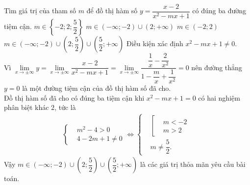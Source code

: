 \begin{ex}%
 Tìm giá trị của tham số $m$ để đồ thị hàm số $y=\dfrac{x-2}{x^2-mx+1}$ có đúng ba đường tiệm cận.
 \choice
  {$m\in\left\{-2;2;\dfrac{5}{2}\right\}$}
  {$m\in(-\infty;-2)\cup(2;+\infty)$}
  {$m\in(-2;2)$}
  {\True $m\in(-\infty;-2)\cup\left(2;\dfrac{5}{2}\right)\cup\left(\dfrac{5}{2};+\infty\right)$}
 \loigiai
  {
  Điều kiện xác định $x^2-mx+1 \neq 0$.\\
  Vì $\lim\limits_{x\to \pm \infty}y= \lim\limits_{x\to \pm \infty}\dfrac{x-2}{x^2-mx+1}=\lim\limits_{x\to \pm \infty}\dfrac{\dfrac{1}{x}-\dfrac{2}{x^2}}{1-\dfrac{m}{x}+\dfrac{1}{x^2}}=0$ nên đường thẳng $y=0$ là một đường tiệm cận của đồ thị hàm số đã cho.\\
  Đồ thị hàm số đã cho có đúng ba tiệm cận khi $x^2-mx+1=0$ có hai nghiệm phân biệt khác $2$, tức là
  \begin{eqnarray*}
   \left\{\begin{aligned}&m^2-4>0 \\&4-2m+1 \neq 0\end{aligned}\right. \Leftrightarrow \left\{\begin{aligned}& \left[\begin{aligned}&m<-2 \\&m>2\end{aligned}\right. \\&m\neq \dfrac{5}{2}.\end{aligned}\right.
  \end{eqnarray*}
  Vậy $m\in(-\infty;-2)\cup\left(2;\dfrac{5}{2}\right)\cup\left(\dfrac{5}{2};+\infty\right)$ là các giá trị thỏa mãn yêu cầu bài toán.
  }
\end{ex}

